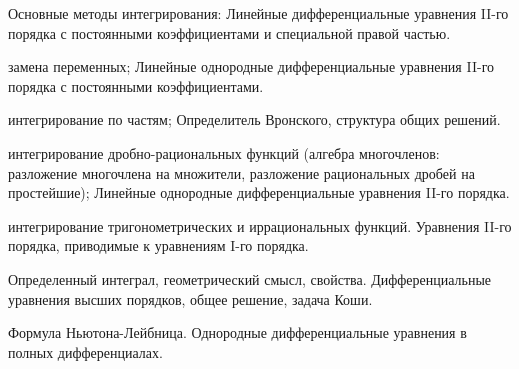 \documentclass[
	14pt,
	a4paper,
	]
	{scrartcl}
\begin{document}
\vfill
\z Основные методы интегрирования:
 \vfill
\z Линейные дифференциальные уравнения II-го порядка с постоянными коэффициентами и специальной правой частью.
 \vfill

\vfill

\newpage


\shapk
{}
\setcounter{zad}{0}

\vfill
\z замена переменных;
 \vfill
\z Линейные однородные дифференциальные уравнения II-го порядка с постоянными коэффициентами.
 \vfill

\vfill

\newpage


\shapk
{}
\setcounter{zad}{0}

\vfill
\z интегрирование по частям;
 \vfill
\z Определитель Вронского, структура общих решений.
 \vfill

\vfill

\newpage


\shapk
{}
\setcounter{zad}{0}

\vfill
\z интегрирование дробно-рациональных функций (алгебра многочленов: разложение многочлена на множители, разложение рациональных дробей на простейшие);
 \vfill
\z Линейные однородные дифференциальные уравнения II-го порядка.
 \vfill

\vfill

\newpage


\shapk
{}
\setcounter{zad}{0}

\vfill
\z интегрирование тригонометрических и иррациональных функций.
 \vfill
\z Уравнения II-го порядка, приводимые к уравнениям I-го порядка.
 \vfill

\vfill

\newpage


\shapk
{}
\setcounter{zad}{0}

\vfill
\z Определенный интеграл, геометрический смысл, свойства.
 \vfill
\z Дифференциальные уравнения высших порядков, общее решение, задача Коши.
 \vfill

\vfill

\newpage


\shapk
{}
\setcounter{zad}{0}

\vfill
\z Формула Ньютона-Лейбница.
 \vfill
\z Однородные дифференциальные уравнения в полных дифференциалах.
 \vfill

\vfill

\newpage
\end{document}

